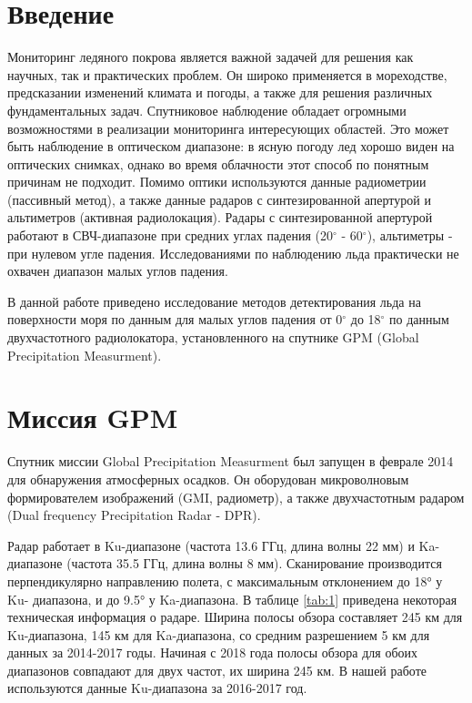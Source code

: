 





\tableofcontents
\newpage
\section{Введение}

Мониторинг ледяного покрова является важной задачей для решения как научных, так и практических проблем. Он широко
применяется в мореходстве, предсказании изменений климата и погоды, а также для решения различных фундаментальных задач.
Спутниковое наблюдение обладает огромными возможностями в реализации мониторинга интересующих областей.
Это может быть наблюдение в оптическом диапазоне: в ясную погоду лед хорошо виден на оптических снимках, однако во время
облачности этот способ по понятным причинам не подходит. Помимо оптики используются данные радиометрии (пассивный
метод), а также данные радаров с синтезированной апертурой и альтиметров (активная радиолокация). Радары с
синтезированной апертурой работают в СВЧ-диапазоне при средних углах падения (20$^{\circ}$ - 60$^{\circ}$), альтиметры - при нулевом
угле падения. Исследованиями по наблюдению льда практически не охвачен диапазон малых углов падения.

В данной работе приведено исследование методов детектирования льда на поверхности моря по данным для малых углов падения
от 0$^{\circ}$ до 18$^{\circ}$ по данным двухчастотного радиолокатора, установленного на спутнике GPM (Global
Precipitation Measurment).

\section{Миссия GPM}

Спутник миссии Global Precipitation Measurment \cite{skof} был запущен в феврале 2014 для обнаружения атмосферных осадков.
Он оборудован микроволновым формирователем изображений (GMI, радиометр), а также двухчастотным радаром (Dual frequency
Precipitation Radar - DPR). 

Радар работает в Ku-диапазоне (частота 13.6 ГГц, длина волны 22 мм) и Ka-диапазоне (частота 35.5 ГГц,
длина волны 8 мм). Сканирование производится перпендикулярно направлению
полета, с максимальным отклонением до 18° у Ku- диапазона, и до 9.5° у Ka-диапазона. В таблице \ref{tab:1} приведена некоторая
техническая информация о радаре. Ширина полосы обзора составляет 245 км для Ku-диапазона, 145 км для Ka-диапазона, со
средним разрешением 5 км для данных за 2014-2017 годы. Начиная с 2018 года полосы обзора для обоих диапазонов совпадают
для двух частот, их ширина 245 км. В нашей работе используются данные Ku-диапазона за 2016-2017 год.  

